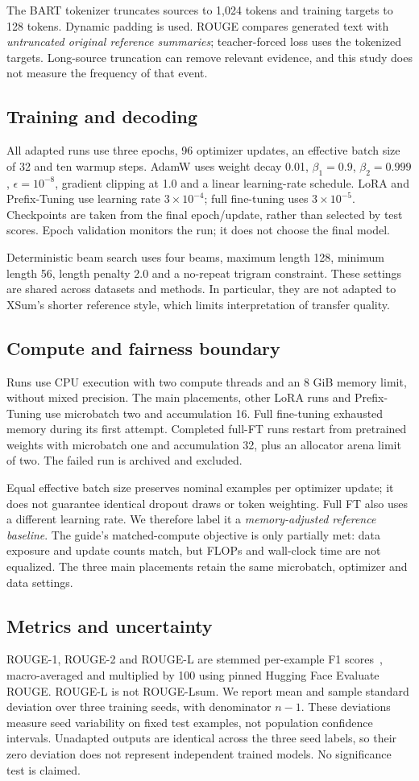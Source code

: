 \documentclass[11pt,letterpaper]{article}
\begin{document}
The BART tokenizer truncates sources to 1,024 tokens and training targets to 128 tokens. Dynamic padding is used. ROUGE compares generated text with \textit{untruncated original reference summaries}; teacher-forced loss uses the tokenized targets. Long-source truncation can remove relevant evidence, and this study does not measure the frequency of that event.
\subsection{Training and decoding}
All adapted runs use three epochs, 96 optimizer updates, an effective batch size of 32 and ten warmup steps. AdamW uses weight decay 0.01, $\beta_1=0.9$, $\beta_2=0.999$, $\epsilon=10^{-8}$, gradient clipping at 1.0 and a linear learning-rate schedule. LoRA and Prefix-Tuning use learning rate $3\times10^{-4}$; full fine-tuning uses $3\times10^{-5}$. Checkpoints are taken from the final epoch/update, rather than selected by test scores. Epoch validation monitors the run; it does not choose the final model.

Deterministic beam search uses four beams, maximum length 128, minimum length 56, length penalty 2.0 and a no-repeat trigram constraint. These settings are shared across datasets and methods. In particular, they are not adapted to XSum's shorter reference style, which limits interpretation of transfer quality.
\subsection{Compute and fairness boundary}
Runs use CPU execution with two compute threads and an 8 GiB memory limit, without mixed precision. The main placements, other LoRA runs and Prefix-Tuning use microbatch two and accumulation 16. Full fine-tuning exhausted memory during its first attempt. Completed full-FT runs restart from pretrained weights with microbatch one and accumulation 32, plus an allocator arena limit of two. The failed run is archived and excluded.

Equal effective batch size preserves nominal examples per optimizer update; it does not guarantee identical dropout draws or token weighting. Full FT also uses a different learning rate. We therefore label it a \textit{memory-adjusted reference baseline}. The guide's matched-compute objective is only partially met: data exposure and update counts match, but FLOPs and wall-clock time are not equalized. The three main placements retain the same microbatch, optimizer and data settings.
\subsection{Metrics and uncertainty}
ROUGE-1, ROUGE-2 and ROUGE-L are stemmed per-example F1 scores~\cite{rouge}, macro-averaged and multiplied by 100 using pinned Hugging Face Evaluate ROUGE. ROUGE-L is not ROUGE-Lsum. We report mean and sample standard deviation over three training seeds, with denominator $n-1$. These deviations measure seed variability on fixed test examples, not population confidence intervals. Unadapted outputs are identical across the three seed labels, so their zero deviation does not represent independent trained models. No significance test is claimed.
\end{document}

